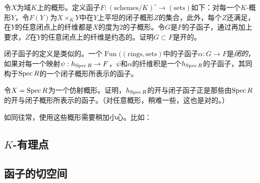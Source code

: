 \begin{exe} \label{exe:6.7}
	令$X$为域$K$上的概形。定义函子$F:(\text{schemes}/K)^\circ \to (\text{sets})$如下：对每一个$K$-概形$Y$，令$F(Y)$为$X\times_K Y$中在$Y$上平坦的闭子概形$Z$的集合，此外，每个$Z$还满足，在$Y$的任意闭点上的纤维都是$X$的度为$2$的子概形。令$G$是$F$的子函子，通过再加上要求，$Z$在$Y$的任意闭点上的纤维是约态的。证明$G\subset F$是开的。
\end{exe}

闭子函子的定义是类似的。一个$\operatorname{Fun}((\text{rings},\text{sets})$中的子函子$\alpha : G\to F$是\textit{闭的}，如果对每一个映射$\psi:h_{\operatorname{Spec} R}\to F$，$\psi$和$\alpha$的纤维积是一个$h_{\operatorname{Spec} R}$的子函子，其同构于$\operatorname{Spec} R$的一个闭子概形所表示的函子。

\begin{exe} \label{exe:6.8}
	令$X=\operatorname{Spec} R$为一个仿射概形。证明，$h_{\operatorname{Spec} R}$的开与闭子函子正是那些由$\operatorname{Spec} R$的开与闭子概形所表示的函子。（对任意概形，稍难一些，这也是对的。）
\end{exe}

如同往常，使用这些概形需要稍加小心。比如：

\nottran



\subsection{\texorpdfstring{$K$}{K}-有理点} \label{s:6.1.2}
\subsection{函子的切空间} \label{s:6.1.3}